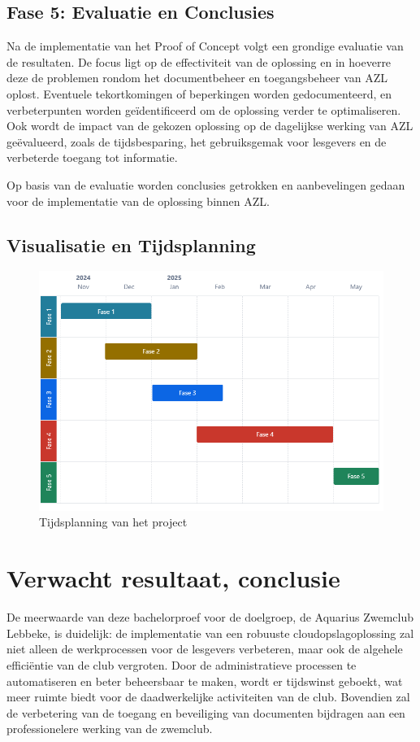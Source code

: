 \subsection{Fase 5: Evaluatie en Conclusies}
Na de implementatie van het Proof of Concept volgt een grondige evaluatie van de resultaten. De focus ligt op de effectiviteit van de oplossing en in hoeverre deze de problemen rondom het documentbeheer en toegangsbeheer van AZL oplost. Eventuele tekortkomingen of beperkingen worden gedocumenteerd, en verbeterpunten worden geïdentificeerd om de oplossing verder te optimaliseren. Ook wordt de impact van de gekozen oplossing op de dagelijkse werking van AZL geëvalueerd, zoals de tijdsbesparing, het gebruiksgemak voor lesgevers en de verbeterde toegang tot informatie.

Op basis van de evaluatie worden conclusies getrokken en aanbevelingen gedaan voor de implementatie van de oplossing binnen AZL.
\subsection{Visualisatie en Tijdsplanning}

\begin{figure}[h!]
    \centering
    \includegraphics[width=.5\textwidth]{../graphics/Chart-Tijd-Visualisatie.png}
    \caption{Tijdsplanning van het project}
    \label{fig:tijdsplanning}
\end{figure}


\section{Verwacht resultaat, conclusie}%
\label{sec:verwachte_resultaten}

De meerwaarde van deze bachelorproef voor de doelgroep, de Aquarius Zwemclub Lebbeke, is duidelijk: de implementatie van een robuuste cloudopslagoplossing zal niet alleen de werkprocessen voor de lesgevers verbeteren, maar ook de algehele efficiëntie van de club vergroten. Door de administratieve processen te automatiseren en beter beheersbaar te maken, wordt er tijdswinst geboekt, wat meer ruimte biedt voor de daadwerkelijke activiteiten van de club. Bovendien zal de verbetering van de toegang en beveiliging van documenten bijdragen aan een professionelere werking van de zwemclub.

